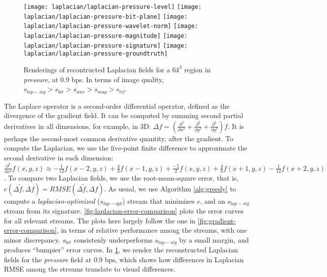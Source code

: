 \begin{figure}[h]
	\centering
	{\texttt{[image: laplacian/laplacian-pressure-level]}}
	{\texttt{[image: laplacian/laplacian-pressure-bit-plane]}}
	{\texttt{[image: laplacian/laplacian-pressure-wavelet-norm]}}
	{\texttt{[image: laplacian/laplacian-pressure-magnitude]}}
	{\texttt{[image: laplacian/laplacian-pressure-signature]}}
	{\texttt{[image: laplacian/laplacian-pressure-groundtruth]}}
	\caption{Renderings of recontructed Laplacian fields for a $64^3$ region in \emph{pressure}, at 0.9 bps.
	In terms of image quality, $s_{lap-sig} > s_{bit} > s_{wav} > s_{mag} > s_{lvl}$.}
	\label{fig:laplacian-renderings}
\end{figure}

The Laplace operator is a second-order differential operator, defined as the divergence of the
gradient field. It can be computed by summing second partial derivatives in all dimensions, for
example, in 3D: $\Delta
f=(\frac{{\partial}^2}{\partial{x^2}}+\frac{{\partial}^2}{\partial{y^2}}+\frac{{\partial}^2}{\partial{y^2}})f$.
It is perhaps the second-most common derivative quantity, after the gradient. To compute the
Laplacian, we use the five-point finite difference to approximate the second derivative in each
dimension: $\frac{{\partial}^2}{\partial{x^2}}f(x,y,z) \approx
-\frac{1}{12}f(x-2,y,z)+\frac{4}{3}f(x-1,y,z)+\frac{-5}{2}f(x,y,z)+\frac{4}{3}f(x+1,y,z)-\frac{1}{12}f(x+2,y,z)$.
To compare two Laplacian fields, we use the root-mean-square error, that is, $e(\Delta
\tilde{f},\Delta f)=RMSE(\Delta \tilde{f},\Delta f)$. As usual, we use Algorithm \cref{alg:greedy}
to compute a \emph{laplacian-optimized} ($s_{lap-opt}$) stream that minimizes $e$, and an
$s_{lap-sig}$ stream from its signature. \cref{fig:laplacian-error-comparison} plots the error
curves for all relevant streams. The plots here largely follow the one in
\cref{fig:gradient-error-comparison}, in terms of relative performance among the streams, with one
minor discrepancy. $s_{bit}$ consistenly underperforms $s_{lap-sig}$ by a small margin, and produces
``bumpier'' error curves. In \cref{fig:laplacian-renderings}, we render the reconstructed Laplacian
fields for the \emph{pressure} field at 0.9 bps, which shows how differences in Laplacian RMSE among
the streams translate to visual differences.
